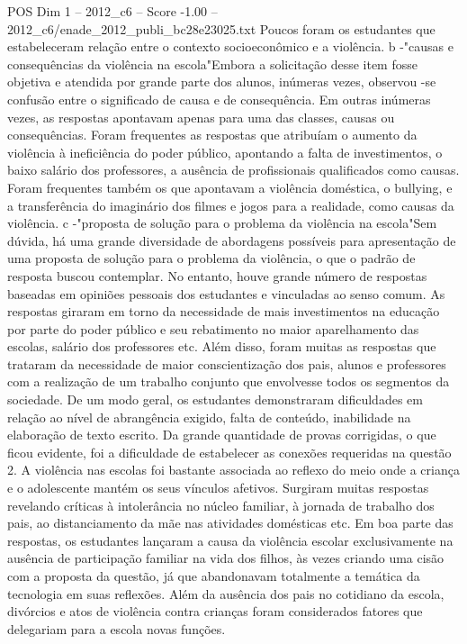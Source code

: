 \begin{textsample}{POS Dim 1 – 2012\_c6 – Score -1.00 – 2012\_c6/enade\_2012\_publi\_bc28e23025.txt}
Poucos foram os estudantes que estabeleceram relação entre o contexto socioeconômico e a violência. b -"causas e consequências da violência na escola"Embora a solicitação desse item fosse objetiva e atendida por grande parte dos alunos, inúmeras vezes, observou -se confusão entre o significado de causa e de consequência.
Em outras inúmeras vezes, as respostas apontavam apenas para uma das classes, causas ou consequências.
Foram frequentes as respostas que atribuíam o aumento da violência à ineficiência do poder público, apontando a falta de investimentos, o baixo salário dos professores, a ausência de profissionais qualificados como causas.
Foram frequentes também os que apontavam a violência doméstica, o bullying, e a transferência do imaginário dos filmes e jogos para a realidade, como causas da violência. c -"proposta de solução para o problema da violência na escola"Sem dúvida, há uma grande diversidade de abordagens possíveis para apresentação de uma proposta de solução para o problema da violência, o que o padrão de resposta buscou contemplar.
No entanto, houve grande número de respostas baseadas em opiniões pessoais dos estudantes e vinculadas ao senso comum.
As respostas giraram em torno da necessidade de mais investimentos na educação por parte do poder público e seu rebatimento no maior aparelhamento das escolas, salário dos professores etc.
Além disso, foram muitas as respostas que trataram da necessidade de maior conscientização dos pais, alunos e professores com a realização de um trabalho conjunto que envolvesse todos os segmentos da sociedade.
De um modo geral, os estudantes demonstraram dificuldades em relação ao nível de abrangência exigido, falta de conteúdo, inabilidade na elaboração de texto escrito.
Da grande quantidade de provas corrigidas, o que ficou evidente, foi a dificuldade de estabelecer as conexões requeridas na questão 2.
A violência nas escolas foi bastante associada ao reflexo do meio onde a criança e o adolescente mantém os seus vínculos afetivos.
Surgiram muitas respostas revelando críticas à intolerância no núcleo familiar, à jornada de trabalho dos pais, ao distanciamento da mãe nas atividades domésticas etc.
Em boa parte das respostas, os estudantes lançaram a causa da violência escolar exclusivamente na ausência de participação familiar na vida dos filhos, às vezes criando uma cisão com a proposta da questão, já que abandonavam totalmente a temática da tecnologia em suas reflexões.
Além da ausência dos pais no cotidiano da escola, divórcios e atos de violência contra crianças foram considerados fatores que delegariam para a escola novas funções.

\end{textsample}
